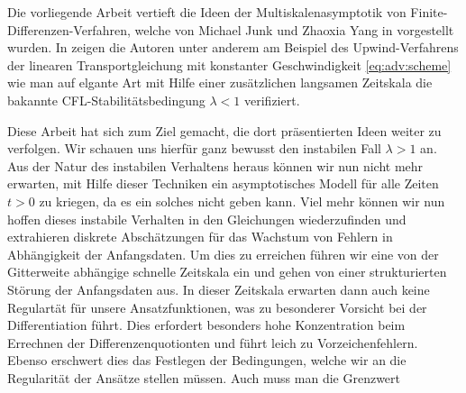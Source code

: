 
Die vorliegende Arbeit vertieft die Ideen der Multiskalenasymptotik von Finite-Differenzen-Verfahren, welche von Michael Junk und Zhaoxia Yang in \cite{Junk2004} vorgestellt wurden. 
In \cite{Junk2004} zeigen die Autoren unter anderem am Beispiel des Upwind-Verfahrens der linearen Transportgleichung mit konstanter Geschwindigkeit \eqref{eq:adv:scheme} wie man auf elgante Art mit Hilfe einer zusätzlichen langsamen Zeitskala die bakannte CFL-Stabilitätsbedingung $\lambda < 1$ verifiziert.

Diese Arbeit hat sich zum Ziel gemacht, die dort präsentierten Ideen weiter zu verfolgen.
Wir schauen uns hierfür ganz bewusst den instabilen Fall $\lambda > 1$ an.
Aus der Natur des instabilen Verhaltens heraus können wir nun nicht mehr erwarten, mit Hilfe dieser Techniken ein asymptotisches Modell für alle Zeiten $t > 0$ zu kriegen, da es ein solches nicht geben kann.
Viel mehr können wir nun hoffen dieses instabile Verhalten in den Gleichungen wiederzufinden und extrahieren diskrete Abschätzungen für das Wachstum von Fehlern in Abhängigkeit der Anfangsdaten.
Um dies zu erreichen führen wir eine von der Gitterweite abhängige schnelle Zeitskala ein und gehen von einer strukturierten Störung der Anfangsdaten aus.
In dieser Zeitskala erwarten dann auch keine Regulartät für unsere Ansatzfunktionen, was zu besonderer Vorsicht bei der Differentiation führt.
Dies erfordert besonders hohe Konzentration beim Errechnen der Differenzenquotionten und führt leich zu Vorzeichenfehlern.
Ebenso erschwert dies das Festlegen der Bedingungen, welche wir an die Regularität der Ansätze stellen müssen.
Auch muss man die Grenzwert 